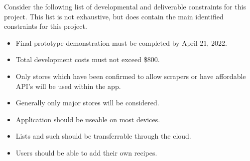 %
%
%
%
%
Consider the following list of developmental and deliverable constraints for this project.  This list is not exhaustive, but does contain the main identified constraints for this project.
\begin{itemize}
  \item Final prototype demonstration must be completed by April 21, 2022.
  \item Total development costs must not exceed \$800.
  \item Only stores which have been confirmed to allow scrapers or have affordable API's will be used within the app.
  \item Generally only major stores will be considered.
  \item Application should be useable on most devices.
  \item Lists and such should be transferrable through the cloud.
  \item Users should be able to add their own recipes.
\end{itemize}
